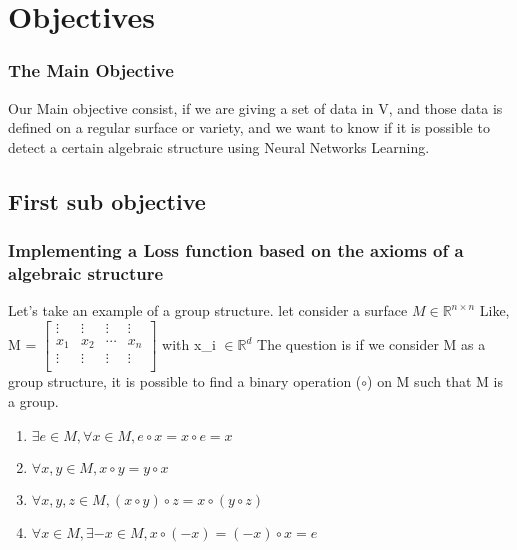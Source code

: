 \documentclass{beamer}
\begin{document}


\section{Objectives}
\begin{frame}
    \frametitle{The Main Objective}
    Our Main objective consist,  if we are giving a set of data in V, and those data is defined on a regular surface or variety, and we want to know if it is possible to detect a certain algebraic structure using Neural Networks Learning.
\end{frame}

\subsection{First sub objective} 
\begin{frame}
    \frametitle{Implementing a Loss function based on the axioms of a
    algebraic structure}
    Let's take an example of a group structure.
    let consider a surface $M \in \mathbb{R}^{n \times n}$
    Like, 
    M = 
    $\begin{bmatrix}
        \vdots & \vdots & \vdots &\vdots \\
        x_{1} & x_{2} & \cdots & x_{n} \\
        \vdots & \vdots & \vdots &\vdots \\
    \end{bmatrix}$
    with x_{i} $\in \mathbb{R}^{d}$
    The question is if we consider M as a group structure, it is possible to find a binary operation ($\circ$) on M such that M is a group.
    \begin{enumerate}
        \item $\exists e \in M, \forall x \in M, e \circ x = x \circ e = x$
        \item $\forall x,y \in M, x \circ y = y \circ x$
        \item $\forall x,y,z \in M, (x \circ y) \circ z = x \circ (y \circ z)$
        \item $\forall x \in M, \exists -x \in M, x \circ (-x) = (-x) \circ x=e$
    \end{enumerate}
\end{frame}


\end{document}
